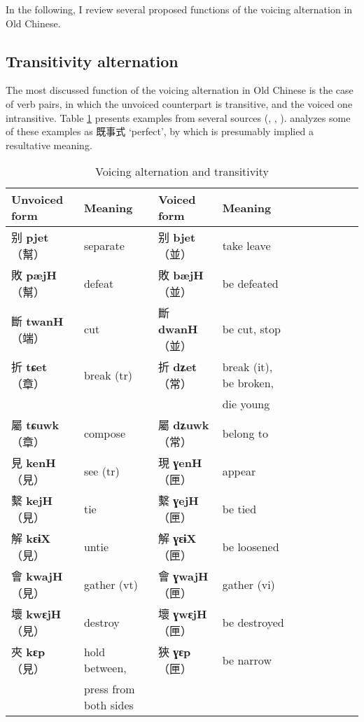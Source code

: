\documentclass[oneside,a4paper,11pt]{article}
\newcommand{\ipa}[1]{\textbf{{\phon\mbox{#1}}}} %
\newcommand{\zh}[1]{{\cn #1}}
\newcommand{\zhc}[2]{\zh{#1} \ipa{#2}}
\newcommand{\mc}[1]{\zh{（#1）}}
\begin{document}
 
 In the following, I review several proposed functions of the voicing alternation in Old Chinese.
 
 \subsection{Transitivity alternation}
 The most discussed function of the voicing alternation in Old Chinese is the case of verb pairs, in which the unvoiced counterpart is transitive, and the voiced one intransitive. Table \ref{tab:voicing.transitivity} presents examples from several sources (\citealt[79-80; 86]{zhou62goucibian}, \citealt{downer73loanwords}, \citealt{sagart03prenasalized}). \citet[86]{zhou62goucibian} analyzes some of these examples as \zh{既事式}  `perfect', by which is presumably implied a resultative meaning.
 
\begin{table}[H]
\caption{Voicing alternation and transitivity} \label{tab:voicing.transitivity}
\begin{tabular}{llllllllll}
\toprule
Unvoiced form &Meaning & Voiced form & Meaning\\
\midrule
\zhc{别}{pjet} \mc{幫}	&separate & \zhc{别}{bjet} \mc{並} & take leave \\
\zhc{敗}{pæjH} \mc{幫}	&defeat & \zhc{敗}{bæjH} \mc{並} & be defeated \\
\midrule
\zhc{斷}{twanH} \mc{端}	&cut & \zhc{斷}{dwanH} \mc{並} & be cut, stop \\
\midrule
\zhc{折}{tɕet} \mc{章}	&break (tr) & \zhc{折}{dʑet} \mc{常} &break (it), be broken, \\
&&&die young \\
\zhc{屬}{tɕuwk} \mc{章}	&compose & \zhc{屬}{dʑuwk} \mc{常} &belong to \\
\midrule 
\zhc{見}{kenH} \mc{見}	&see (tr) & \zhc{現}{ɣenH} \mc{匣} & appear \\
\zhc{繫}{kejH} \mc{見}	&tie & \zhc{繫}{ɣejH} \mc{匣} & be tied \\
\zhc{解}{kɛɨX} \mc{見}	&untie & \zhc{解}{ɣɛɨX} \mc{匣} & be loosened \\
\zhc{會}{kwajH} \mc{見}	&gather (vt) & \zhc{會}{ɣwajH} \mc{匣} & gather (vi) \\
\zhc{壞}{kwɛjH} \mc{見}	&destroy  & \zhc{壞}{ɣwɛjH} \mc{匣} & be destroyed \\
\zhc{夾}{kɛp} \mc{見}	&hold between,   & \zhc{狹}{ɣɛp} \mc{匣} & be narrow \\
&press from both sides&&\\
\bottomrule
\end{tabular}
\end{table}
\end{document}
